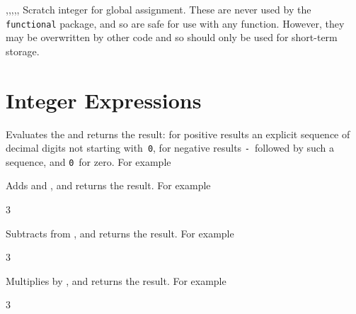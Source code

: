 \documentclass[oneside]{book}
\begin{document}
\begin{variable}{\gTmpaInt,\gTmpbInt,\gTmpcInt,\gTmpiInt,\gTmpjInt,\gTmpkInt}
Scratch integer for global assignment. These are never used by
the \verb!functional! package, and so are safe for use with any
function. However, they may be overwritten by other
code and so should only be used for short-term storage.
\end{variable}

\section{Integer Expressions}

\begin{function}{\IntEval}
\begin{syntax}
 
\end{syntax}
Evaluates the  and returns the result:
for positive results an
explicit sequence of decimal digits not starting with~\texttt{0},
for negative results \texttt{-}~followed by such a sequence, and
\texttt{0}~for zero. For example
\begin{demohigh}
\end{demohigh}
\end{function}

\begin{function}{\IntMathAdd}
\begin{syntax}
  
\end{syntax}
Adds  and ,
and returns the result. For example
\begin{demohigh}
 {3}
\end{demohigh}
\end{function}

\begin{function}{\IntMathSub}
\begin{syntax}
  
\end{syntax}
Subtracts  from ,
and returns the result. For example
\begin{demohigh}
 {3}
\end{demohigh}
\end{function}

\begin{function}{\IntMathMult}
\begin{syntax}
  
\end{syntax}
Multiplies  by ,
and returns the result. For example
\begin{demohigh}
 {3}
\end{demohigh}
\end{function}
\end{document}
